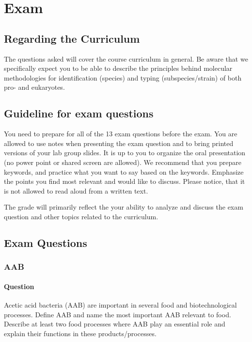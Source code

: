 \setlength{\headheight}{12.71342pt}
\addtolength{\topmargin}{-0.71342pt}

\chapter{Exam}

\section{Regarding the Curriculum}
The questions asked will cover the course curriculum in general. Be aware that we specifically expect you to be able to describe the principles behind molecular methodologies for identification (species) and typing (subspecies/strain) of both pro- and eukaryotes.  

\section{Guideline for exam questions}
You need to prepare for all of the 13 exam questions before the exam. You are allowed to use notes when presenting the exam question and to bring printed versions of your lab group slides. It is up to you to organize the oral presentation (no power point or shared screen are allowed). We recommend that you prepare keywords, and practice what you want to say based on the keywords. Emphasize the points you find most relevant and would like to discuss. Please notice, that it is not allowed to read aloud from a written text.  

The grade will primarily reflect the your ability to analyze and discuss the exam question and other topics related to the curriculum. 

\section{Exam Questions}

\subsection{AAB}
\subsubsection*{Question}
Acetic acid bacteria (AAB) are important in several food and biotechnological processes. Define AAB and name the most important AAB relevant to food. Describe at least two food processes where AAB play an essential role and explain their functions in these products/processes.

